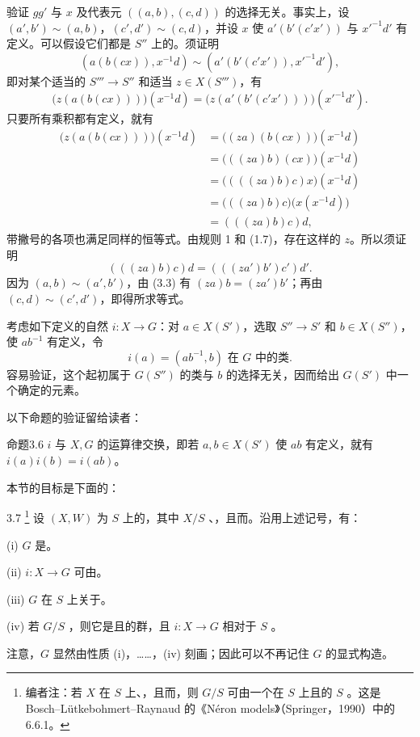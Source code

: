 验证 $gg'$ 与 $x$ 及代表元 $((a,b),(c,d))$ 的选择无关。事实上，设 $(a',b')\sim(a,b)$，$(c',d')\sim(c,d)$，并设 $x$ 使 $a'(b'(c'x'))$ 与 $x'^{-1}d'$ 有定义。可以假设它们都是 $S''$ 上的。须证明
\[
(a(b(cx)),x^{-1}d)\sim(a'(b'(c'x')),x'^{-1}d'),
\]
即对某个适当的 $S'''\to S''$ 和适当 $z\in X(S''')$，有
\[
\bigl(z(a(b(cx)))\bigr)(x^{-1}d)=\bigl(z(a'(b'(c'x')))\bigr)(x'^{-1}d').
\]
只要所有乘积都有定义，就有
\[
\begin{aligned}
\bigl(z(a(b(cx)))\bigr)(x^{-1}d)
&=\bigl((za)(b(cx))\bigr)(x^{-1}d)\\
&=\bigl(((za)b)(cx)\bigr)(x^{-1}d)\\
&=\bigl((((za)b)c)x\bigr)(x^{-1}d)\\
&=\bigl(((za)b)c\bigr)\bigl(x(x^{-1}d)\bigr)\\
&=(((za)b)c)d,
\end{aligned}
\]
带撇号的各项也满足同样的恒等式。由规则 1 和 (1.7)，存在这样的 $z$。所以须证明
\[
(((za)b)c)d=(((za')b')c')d'.
\]
因为 $(a,b)\sim(a',b')$，由 (3.3) 有 $(za)b=(za')b'$；再由 $(c,d)\sim(c',d')$，即得所求等式。

考虑如下定义的自然 $i:X\to G$：对 $a\in X(S')$，选取 $S''\to S'$ 和 $b\in X(S'')$，使 $ab^{-1}$ 有定义，令
\[
i(a)=(ab^{-1},b)\text{ 在 }G\text{ 中的类}.
\]
容易验证，这个起初属于 $G(S'')$ 的类与 $b$ 的选择无关，因而给出 $G(S')$ 中一个确定的元素。

以下命题的验证留给读者：
\begin{SGAresult}{命题}{3.6}
 $i$ 与 $X,G$ 的运算律交换，即若 $a,b\in X(S')$ 使 $ab$ 有定义，就有 $i(a)i(b)=i(ab)$。
\end{SGAresult}
本节的目标是下面的：
\begin{SGAresult}{}{3.7}
\footnote{编者注：若 $X$ 在 $S$ 上、，且而，则 $G/S$ 可由一个在 $S$ 上且的 $S$ 。这是 Bosch--Lütkebohmert--Raynaud 的《Néron models》（Springer，1990）中的 6.6.1。}
设 $(X,W)$ 为 $S$ 上的，其中 $X/S$ 、，且而。沿用上述记号，有：

(i) $G$ 是。

(ii) $i:X\to G$ 可由。

(iii) $G$ 在 $S$ 上关于。

(iv) 若 $G/S$ ，则它是且的群，且 $i:X\to G$ 相对于 $S$ 。
\end{SGAresult}
注意，$G$ 显然由性质 (i)，……，(iv) 刻画；因此可以不再记住 $G$ 的显式构造。

